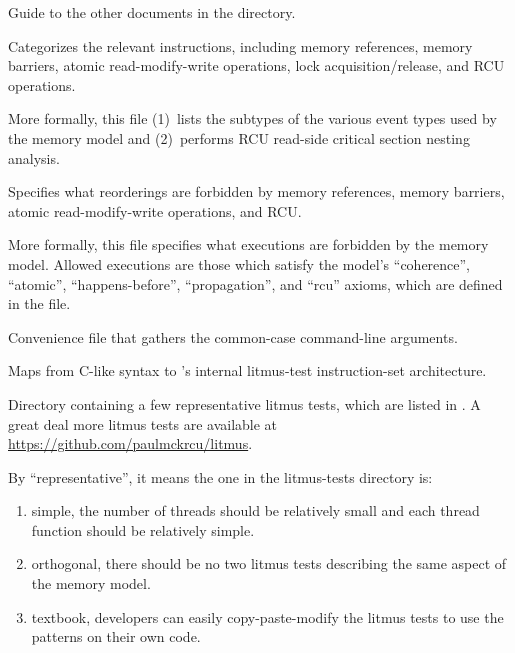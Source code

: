 \begin{description}[style=nextline]
\item[\path{Documentation/README}]
	Guide to the other documents in the  directory.

\item[\path{linux-kernel.bell}]
	Categorizes the relevant instructions, including memory
	references, memory barriers, atomic read-modify-write operations,
	lock acquisition/release, and RCU operations.

	More formally, this file (1)~lists the subtypes of the various
	event types used by the memory model and (2)~performs RCU
	read-side critical section nesting analysis.

\item[\path{linux-kernel.cat}]
	Specifies what reorderings are forbidden by memory references,
	memory barriers, atomic read-modify-write operations, and RCU\@.

	More formally, this file specifies what executions are forbidden
	by the memory model.
	Allowed executions are those which satisfy the model's ``coherence'',
	``atomic'', ``happens-before'',	``propagation'', and ``rcu'' axioms,
	which are defined in the file.

\item[\path{linux-kernel.cfg}]
	Convenience file that gathers the common-case  command-line
	arguments.

\item[\path{linux-kernel.def}]
	Maps from C-like syntax to 's internal litmus-test
	instruction-set architecture.

\item[\path{litmus-tests}]
	Directory containing a few representative litmus tests, which
	are listed in .
        A great deal more litmus tests are available at
	\url{https://github.com/paulmckrcu/litmus}.

	By ``representative'', it means the one in the litmus-tests
	directory is:

	\begin{enumerate}
	  \item	simple, the number of threads should be relatively
		small and each thread function should be relatively
		simple.
	  \item orthogonal, there should be no two litmus tests
		describing the same aspect of the memory model.
	  \item textbook, developers can easily copy-paste-modify
		the litmus tests to use the patterns on their own
		code.
	\end{enumerate}


\end{description}
